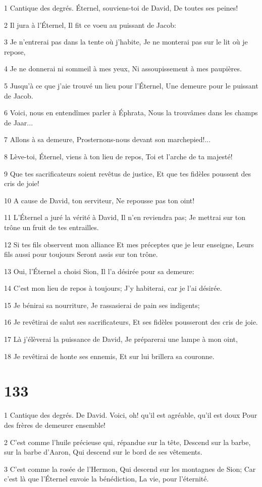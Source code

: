 \par 1 Cantique des degrés. Éternel, souviens-toi de David, De toutes ses peines!
\par 2 Il jura à l'Éternel, Il fit ce voeu au puissant de Jacob:
\par 3 Je n'entrerai pas dans la tente où j'habite, Je ne monterai pas sur le lit où je repose,
\par 4 Je ne donnerai ni sommeil à mes yeux, Ni assoupissement à mes paupières.
\par 5 Jusqu'à ce que j'aie trouvé un lieu pour l'Éternel, Une demeure pour le puissant de Jacob.
\par 6 Voici, nous en entendîmes parler à Éphrata, Nous la trouvâmes dans les champs de Jaar...
\par 7 Allons à sa demeure, Prosternons-nous devant son marchepied!...
\par 8 Lève-toi, Éternel, viens à ton lieu de repos, Toi et l'arche de ta majesté!
\par 9 Que tes sacrificateurs soient revêtus de justice, Et que tes fidèles poussent des cris de joie!
\par 10 A cause de David, ton serviteur, Ne repousse pas ton oint!
\par 11 L'Éternel a juré la vérité à David, Il n'en reviendra pas; Je mettrai sur ton trône un fruit de tes entrailles.
\par 12 Si tes fils observent mon alliance Et mes préceptes que je leur enseigne, Leurs fils aussi pour toujours Seront assis sur ton trône.
\par 13 Oui, l'Éternel a choisi Sion, Il l'a désirée pour sa demeure:
\par 14 C'est mon lieu de repos à toujours; J'y habiterai, car je l'ai désirée.
\par 15 Je bénirai sa nourriture, Je rassasierai de pain ses indigents;
\par 16 Je revêtirai de salut ses sacrificateurs, Et ses fidèles pousseront des cris de joie.
\par 17 Là j'élèverai la puissance de David, Je préparerai une lampe à mon oint,
\par 18 Je revêtirai de honte ses ennemis, Et sur lui brillera sa couronne.

\chapter{133}

\par 1 Cantique des degrés. De David. Voici, oh! qu'il est agréable, qu'il est doux Pour des frères de demeurer ensemble!
\par 2 C'est comme l'huile précieuse qui, répandue sur la tête, Descend sur la barbe, sur la barbe d'Aaron, Qui descend sur le bord de ses vêtements.
\par 3 C'est comme la rosée de l'Hermon, Qui descend sur les montagnes de Sion; Car c'est là que l'Éternel envoie la bénédiction, La vie, pour l'éternité.

